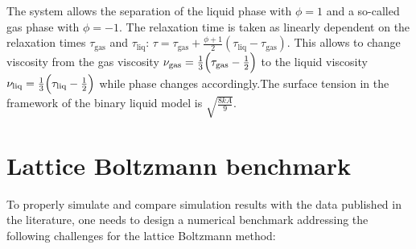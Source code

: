 \documentclass[preprint,12pt]{elsarticle}
\begin{document}
The system allows the separation of the liquid
phase with $\phi=1$ and a so-called gas phase with $\phi=-1$. The
relaxation time is taken as linearly dependent on the relaxation
times $\tau_{\mathrm{gas}}$ and $\tau_{\mathrm{liq}}$:
$\tau=\tau_{\mathrm{gas}}+\frac{\phi+1}{2}(\tau_{\mathrm{liq}}-\tau_{\mathrm{gas}})$. This allows
to change viscosity from the gas viscosity
$\nu_{\mathrm{gas}}=\frac{1}{3}\Bigl(\tau_{\mathrm{gas}}-\frac{1}{2}\Bigr)$ to the liquid viscosity
$\nu_{\mathrm{liq}}=\frac{1}{3}\Bigl(\tau_{\mathrm{liq}}-\frac{1}{2}\Bigr)$ while phase changes
accordingly.The surface tension in the framework of the binary liquid model is $\sqrt{\frac{8 k
A}{9}}$.

\section{Lattice Boltzmann benchmark}
To properly simulate and compare simulation results with the data
published in the literature, one needs to design a numerical benchmark addressing
the following challenges for the lattice Boltzmann method:
\end{document}
